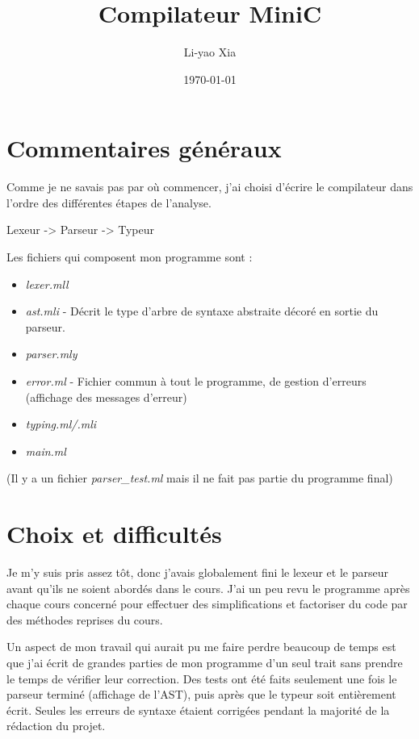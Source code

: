 \documentclass[a4paper]{article}
\begin{document}
\title{Compilateur MiniC}
\author{Li-yao Xia}
\date{\today}

\maketitle

\section{Commentaires généraux}

Comme je ne savais pas par où commencer,
j'ai choisi d'écrire le compilateur dans l'ordre des différentes étapes
de l'analyse. 

Lexeur -> Parseur -> Typeur

Les fichiers qui composent mon programme sont :
\begin{itemize}
  \item {\it lexer.mll}
  \item {\it ast.mli} - Décrit le type d'arbre de syntaxe abstraite décoré en
sortie du parseur.
  \item {\it parser.mly}
  \item {\it error.ml} - Fichier commun à tout le programme, de gestion
d'erreurs (affichage des messages d'erreur)
  \item {\it typing.ml/.mli}
  \item {\it main.ml}
\end{itemize}

(Il y a un fichier {\it parser\_test.ml} mais il ne fait pas partie du
programme final)

\section{Choix et difficultés}

Je m'y suis pris assez tôt, donc j'avais globalement fini le
lexeur et le parseur avant qu'ils ne soient abordés dans le cours.
J'ai un peu revu le programme après chaque cours concerné pour effectuer
des simplifications et factoriser du code par des méthodes reprises du
cours. 

Un aspect de mon travail qui aurait pu me faire perdre beaucoup de temps est que 
j'ai écrit de grandes parties de mon programme d'un seul trait
sans prendre le temps de vérifier leur correction.
Des tests ont été faits seulement une fois le
parseur terminé (affichage de l'AST), puis 
après que le typeur soit entièrement écrit.
Seules les erreurs de syntaxe étaient corrigées
pendant la majorité de la rédaction du projet. 
\end{document}
